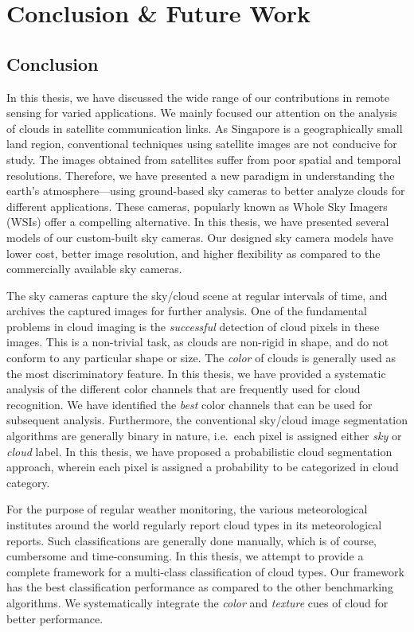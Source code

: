 \chapter{Conclusion \& Future Work}
\label{chap:conclusion}


\section{Conclusion}
In this thesis, we have discussed the wide range of our contributions in remote sensing for varied applications. We mainly focused our attention on the analysis of clouds in satellite communication links. As Singapore is a geographically small land region, conventional techniques using satellite images are not conducive for study. The images obtained from satellites suffer from poor spatial and temporal resolutions. Therefore, we have presented a new paradigm in understanding the earth's atmosphere---using ground-based sky cameras to better analyze clouds for different applications. These cameras, popularly known as Whole Sky Imagers (WSIs) offer a compelling alternative. In this thesis, we have presented several models of our custom-built sky cameras. Our designed sky camera models have lower cost, better image resolution, and higher flexibility as compared to the commercially available sky cameras.

The sky cameras capture the sky/cloud scene at regular intervals of time, and archives the captured images for further analysis. One of the fundamental problems in cloud imaging is the \emph{successful} detection of cloud pixels in these images. This is a non-trivial task, as clouds are non-rigid in shape, and do not conform to any particular shape or size. The \emph{color} of clouds is generally used as the most discriminatory feature. In this thesis, we have provided a systematic analysis of the different color channels that are frequently used for cloud recognition. We have identified the \emph{best} color channels that can be used for subsequent analysis. Furthermore, the conventional sky/cloud image segmentation algorithms are generally binary in nature, i.e.\ each pixel is assigned either \emph{sky} or \emph{cloud} label. In this thesis, we have proposed a probabilistic cloud segmentation approach, wherein each pixel is assigned a probability to be categorized in cloud category. 

For the purpose of regular weather monitoring, the various meteorological institutes around the world regularly report cloud types in its meteorological reports. Such classifications are generally done manually, which is of course, cumbersome and time-consuming. In this thesis, we attempt to provide a complete framework for a multi-class classification of cloud types. Our framework has the best classification performance as compared to the other benchmarking algorithms. We systematically integrate the \emph{color} and \emph{texture} cues of cloud for better performance. 

